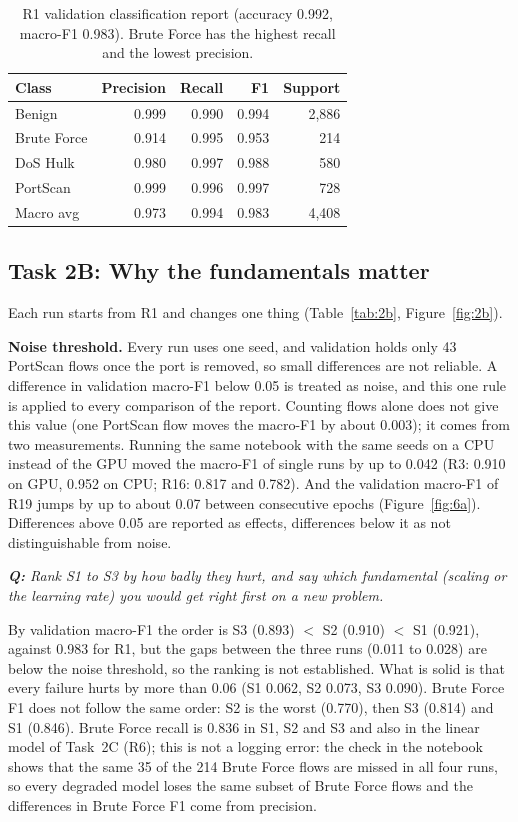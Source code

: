 \documentclass[9pt]{extarticle}
\newcommand{\qa}[1]{\par\vspace{2pt}\noindent\textit{\textbf{Q:} #1}\par\nopagebreak\noindent}
\newcommand{\run}[1]{\textsf{#1}}   %
\begin{document}
\begin{table}[htbp]
\centering\small
\caption{\run{R1} validation classification report (accuracy 0.992, macro-F1 0.983). Brute Force
has the highest recall and the lowest precision.}
\label{tab:r1}
\begin{tabular}{@{}lrrrr@{}}
\toprule
Class & Precision & Recall & F1 & Support\\
\midrule
Benign       & 0.999 & 0.990 & 0.994 & 2,886\\
Brute Force  & 0.914 & 0.995 & 0.953 &   214\\
DoS Hulk     & 0.980 & 0.997 & 0.988 &   580\\
PortScan     & 0.999 & 0.996 & 0.997 &   728\\
\midrule
Macro avg    & 0.973 & 0.994 & 0.983 & 4,408\\
\bottomrule
\end{tabular}
\end{table}

\subsection{Task 2B: Why the fundamentals matter}\label{sec:noise}
Each run starts from \run{R1} and changes one thing (Table~\ref{tab:2b}, Figure~\ref{fig:2b}).

\textbf{Noise threshold.} Every run uses one seed, and validation holds only 43 PortScan flows once
the port is removed, so small differences are not reliable. A difference in validation macro-F1
below 0.05 is treated as noise, and this one rule is applied to every comparison of the
report. Counting flows alone does not give this value (one PortScan flow moves the macro-F1 by about
0.003); it comes from two measurements. Running the same notebook with the same seeds on a CPU instead of the
GPU moved the macro-F1 of single runs by up to 0.042 (\run{R3}: 0.910 on GPU, 0.952 on CPU;
\run{R16}: 0.817 and 0.782). And the validation macro-F1 of \run{R19} jumps by up to about 0.07
between consecutive epochs (Figure~\ref{fig:6a}). Differences above 0.05 are reported as effects,
differences below it as not distinguishable from noise.

\qa{Rank S1 to S3 by how badly they hurt, and say which fundamental (scaling or the learning rate)
you would get right first on a new problem.}
By validation macro-F1 the order is S3 (0.893) $<$ S2 (0.910) $<$ S1 (0.921), against 0.983 for
\run{R1}, but the gaps between the three runs (0.011 to 0.028) are below the noise threshold, so the
ranking is not established. What is solid is that every failure hurts by more than 0.06 (S1 0.062,
S2 0.073, S3 0.090). Brute Force F1 does not follow the same order: S2 is the worst (0.770), then S3
(0.814) and S1 (0.846). Brute Force recall is 0.836 in S1, S2 and S3 and also in the linear model
of Task~2C (\run{R6}); this is not a logging error: the check in the notebook shows that the same 35
of the 214 Brute Force flows are missed in all four runs, so every degraded model loses the same
subset of Brute Force flows and the differences in Brute Force F1 come from precision.
\end{document}
